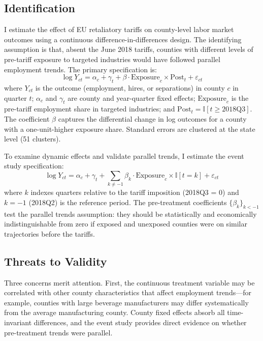 \documentclass[12pt]{article}
\newcommand{\ind}{\mathbb{I}}
\begin{document}
\subsection{Identification}

I estimate the effect of EU retaliatory tariffs on county-level labor market outcomes using a continuous difference-in-differences design. The identifying assumption is that, absent the June 2018 tariffs, counties with different levels of pre-tariff exposure to targeted industries would have followed parallel employment trends. The primary specification is:
\begin{equation}
\log Y_{ct} = \alpha_c + \gamma_t + \beta \cdot \text{Exposure}_c \times \text{Post}_t + \varepsilon_{ct}
\label{eq:static}
\end{equation}
where $Y_{ct}$ is the outcome (employment, hires, or separations) in county $c$ in quarter $t$; $\alpha_c$ and $\gamma_t$ are county and year-quarter fixed effects; $\text{Exposure}_c$ is the pre-tariff employment share in targeted industries; and $\text{Post}_t = \ind[t \geq 2018\text{Q3}]$. The coefficient $\beta$ captures the differential change in log outcomes for a county with a one-unit-higher exposure share. Standard errors are clustered at the state level (51 clusters).

To examine dynamic effects and validate parallel trends, I estimate the event study specification:
\begin{equation}
\log Y_{ct} = \alpha_c + \gamma_t + \sum_{k \neq -1} \beta_k \cdot \text{Exposure}_c \times \ind[t = k] + \varepsilon_{ct}
\label{eq:eventstudy}
\end{equation}
where $k$ indexes quarters relative to the tariff imposition (2018Q3 = 0) and $k = -1$ (2018Q2) is the reference period. The pre-treatment coefficients $\{\beta_k\}_{k < -1}$ test the parallel trends assumption: they should be statistically and economically indistinguishable from zero if exposed and unexposed counties were on similar trajectories before the tariffs.

\subsection{Threats to Validity}

Three concerns merit attention. First, the continuous treatment variable may be correlated with other county characteristics that affect employment trends---for example, counties with large beverage manufacturers may differ systematically from the average manufacturing county. County fixed effects absorb all time-invariant differences, and the event study provides direct evidence on whether pre-treatment trends were parallel.
\end{document}
